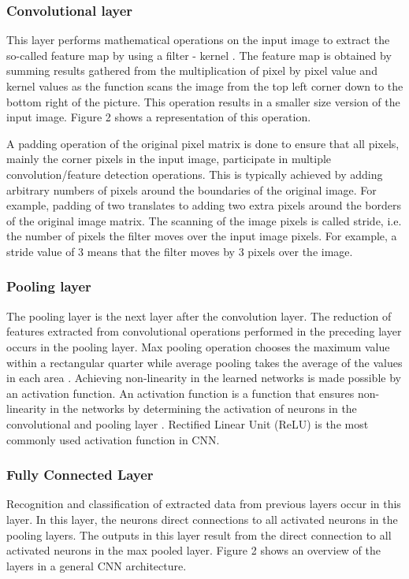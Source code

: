 \documentclass[conference]{IEEEtran}
\begin{document}
\subsubsection{Convolutional layer}
This layer performs mathematical operations on the input image to extract the so-called feature map by using a filter - kernel \cite{goodfellow2016deep}. The feature map is obtained by summing results gathered from the multiplication of pixel by pixel value and kernel values as the function scans the image from the top left corner down to the bottom right of the picture. This operation results in a smaller size version of the input image. Figure 2 shows a representation of this operation.

A padding operation of the original pixel matrix is done to ensure that all pixels, mainly the corner pixels in the input image, participate in multiple convolution/feature detection operations. This is typically achieved by adding arbitrary numbers of pixels around the boundaries of the original image. For example, padding of two translates to adding two extra pixels around the borders of the original image matrix. The scanning of the image pixels is called stride, i.e. the number of pixels the filter moves over the input image pixels. For example, a stride value of 3 means that the filter moves by 3 pixels over the image.


\subsubsection{Pooling layer}
The pooling layer is the next layer after the convolution layer. The reduction of features extracted from convolutional operations performed in the preceding layer occurs in the pooling layer. Max pooling operation chooses the maximum value within a rectangular quarter while average pooling takes the average of the values in each area \cite{goodfellow2016deep}.
Achieving non-linearity in the learned networks is made possible by an activation function.
An activation function is a function that ensures non-linearity in the networks by determining the activation of neurons in the convolutional and pooling layer \cite{nielsen2015neural}. Rectified Linear Unit (ReLU) is the most commonly used activation function in CNN.



\subsubsection{Fully Connected Layer}
Recognition and classification of extracted data from previous layers occur in this layer. In this layer, the neurons direct connections to all activated neurons in the pooling layers. The outputs in this layer result from the direct connection to all activated neurons in the max pooled layer. Figure 2 shows an overview of the layers in a general CNN architecture.
\end{document}
